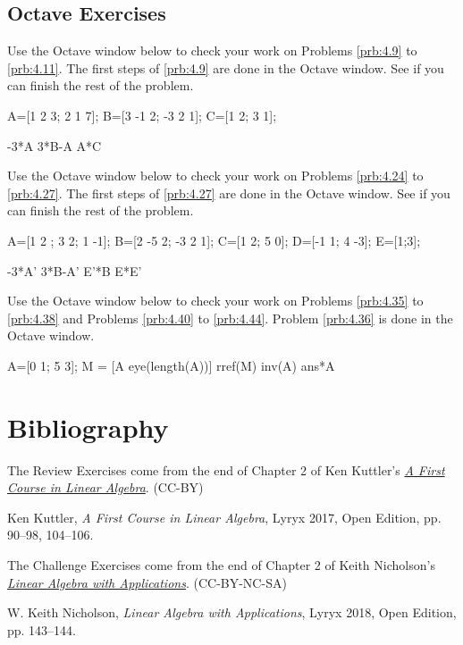 \documentclass{ximera}
\begin{document}
\subsection*{Octave Exercises}
\begin{problem}\label{oct:matr_mult}
Use the Octave window below to check your work on Problems \ref{prb:4.9} to \ref{prb:4.11}.  The first steps of \ref{prb:4.9} are done in the Octave window.  See if you can finish the rest of the problem.

A=[1 2 3; 2 1 7];
B=[3 -1 2; -3 2 1];
C=[1 2; 3 1];

-3*A
3*B-A
A*C %
\end{problem}

\begin{problem}\label{oct:matr_ops}
Use the Octave window below to check your work on Problems \ref{prb:4.24} to \ref{prb:4.27}.  The first steps of \ref{prb:4.27} are done in the Octave window.  See if you can finish the rest of the problem.

A=[1 2 ; 3 2; 1 -1];
B=[2 -5 2; -3 2 1];
C=[1 2; 5 0];
D=[-1 1; 4 -3];
E=[1;3];

-3*A'
3*B-A'
E'*B
E*E'

\end{problem}

\begin{problem}\label{oct:matr_inv}
Use the Octave window below to check your work on Problems \ref{prb:4.35} to \ref{prb:4.38} and Problems \ref{prb:4.40} to \ref{prb:4.44}.  Problem \ref{prb:4.36} is done in the Octave window.  

A=[0 1; 5 3];
M = [A eye(length(A))]
rref(M)
inv(A)
ans*A
\end{problem}


\section*{Bibliography}
The Review Exercises come from the end of Chapter 2 of Ken Kuttler's \href{https://open.umn.edu/opentextbooks/textbooks/a-first-course-in-linear-algebra-2017}{\it A First Course in Linear Algebra}. (CC-BY)

Ken Kuttler, {\it  A First Course in Linear Algebra}, Lyryx 2017, Open Edition, pp. 90--98, 104--106.  

The Challenge Exercises come from the end of Chapter 2 of Keith Nicholson's \href{https://open.umn.edu/opentextbooks/textbooks/linear-algebra-with-applications}{\it Linear Algebra with Applications}. (CC-BY-NC-SA)

W. Keith Nicholson, {\it Linear Algebra with Applications}, Lyryx 2018, Open Edition, pp. 143--144. 
\end{document}

